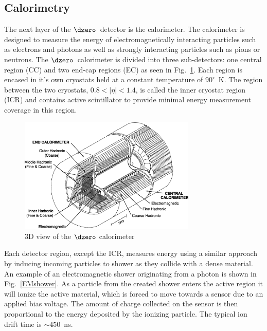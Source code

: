 

\subsection{Calorimetry}
\label{calorimetry}

The next layer of the $\dzero$~detector is the calorimeter. The calorimeter is designed to measure the energy of electromagnetically interacting particles such as electrons and photons as well as strongly interacting particles such as pions or neutrons. The $\dzero$~calorimeter is divided into three sub-detectors: one central region (CC) and two end-cap regions (EC) as seen in Fig.~\ref{Calorimeter}. Each region is encased in it's own cryostats held at a constant temperature of $90^{\circ}$~K. The region between the two cryostats, $0.8 < |\eta| < 1.4$, is called the inner cryostat region (ICR) and contains active scintillator to provide minimal energy measurement coverage in this region.

\begin{figure}[!h!tbp]
\begin{center}
\includegraphics[width=0.75\textwidth]{eps/D0/Calorimeter.eps}
\end{center}
\vspace{-0.1in}
\caption{3D view of the $\dzero$ calorimeter}
\label{Calorimeter}
\end{figure}

Each detector region, except the ICR, measures energy using a similar approach by inducing incoming particles to shower as they collide with a dense material. An example of an electromagnetic shower originating from a photon is shown in Fig.~\ref{EMshower}. As a particle from the created shower enters the active region it will ionize the active material, which is forced to move towards a sensor due to an applied bias voltage. The amount of charge collected on the sensor is then proportional to the energy deposited by the ionizing particle. The typical ion drift time is $\sim450$~ns.


